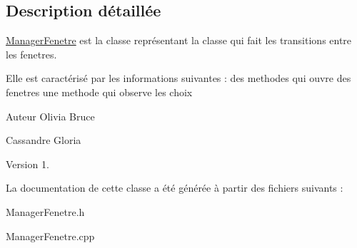 \subsection{\-Description détaillée}
\hyperlink{classManagerFenetre}{\-Manager\-Fenetre} est la classe représentant la classe qui fait les transitions entre les fenetres. 

\-Elle est caractérisé par les informations suivantes \-: des methodes qui ouvre des fenetres une methode qui observe les choix

\begin{DoxyAuthor}{\-Auteur}
\-Olivia \-Bruce 

\-Cassandre \-Gloria 
\end{DoxyAuthor}
\begin{DoxyVersion}{\-Version}
1. 
\end{DoxyVersion}


\-La documentation de cette classe a été générée à partir des fichiers suivants \-:\begin{DoxyCompactItemize}
\item 
\-Manager\-Fenetre.\-h\item 
\-Manager\-Fenetre.\-cpp\end{DoxyCompactItemize}
